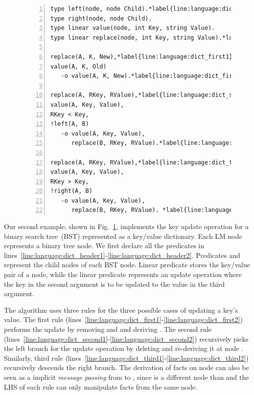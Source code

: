 
\begin{figure}[ht]
\begin{Verbatim}[numbers=left,fontsize=\codesize,commandchars=\*\{\}]
type left(node, node Child).*label{line:language:dict_header1}*hfill // Predicate declaration
type right(node, node Child).
type linear value(node, int Key, string Value).
type linear replace(node, int Key, string Value).*label{line:language:dict_header2}

replace(A, K, New),*label{line:language:dict_first1}*hfill// Rule 1: we found our key
value(A, K, Old)
   -o value(A, K, New).*label{line:language:dict_first2}

replace(A, RKey, RValue),*label{line:language:dict_second1}*hfill// Rule 2: go left
value(A, Key, Value),
RKey < Key,
!left(A, B)
   -o value(A, Key, Value),
      replace(B, RKey, RValue).*label{line:language:dict_second2}

replace(A, RKey, RValue),*label{line:language:dict_third1}*hfill// Rule 3: go right
value(A, Key, Value),
RKey > Key,
!right(A, B)
   -o value(A, Key, Value),
      replace(B, RKey, RValue). *label{line:language:dict_third2}
\end{Verbatim}
\label{code:language:btree_replace}
\end{figure}

Our second example, shown in Fig.~\ref{code:language:btree_replace}, implements
the key update operation for a binary search tree~(BST) represented as a
key/value dictionary. Each LM node represents a binary tree node. We first
declare all the predicates in
lines~\ref{line:language:dict_header1}-\ref{line:language:dict_header2}.
Predicates  and  represent the child nodes of each BST
node. Linear predicate  stores the key/value pair of a node, while
the linear predicate  represents an update operation where the key
in the second argument is to be updated to the value in the third argument.

The algorithm uses three rules for the three possible cases of updating a key's
value. The first rule
(lines~\ref{line:language:dict_first1}-\ref{line:language:dict_first2}) performs
the update by removing  and  and
deriving . The second rule
(lines~\ref{line:language:dict_second1}-\ref{line:language:dict_second2})
recursively picks the left branch for the update operation by deleting
 and re-deriving it at node . Similarly,
third rule
(lines~\ref{line:language:dict_third1}-\ref{line:language:dict_third2})
recursively descends the right branch. The derivation of  facts on
node  can also be seen as a implicit \emph{message passing} from
 to , since  is a different node than  and the
LHS of each rule can only manipulate facts from the same node.

